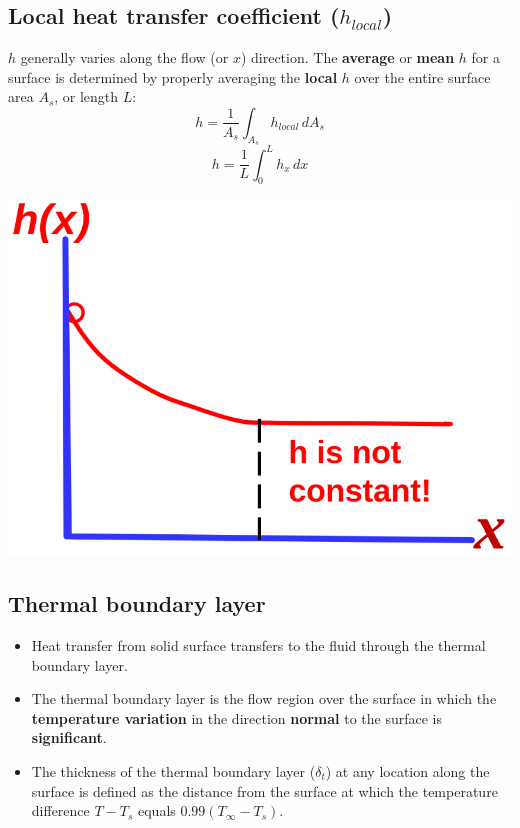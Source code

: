\documentclass[11pt]{article}
\begin{document}
 \newpage

\subsection{Local heat transfer coefficient (\(h_{local}\))}
\label{sec:orgdb3497e}
\(h\) generally varies along the flow (or \(x\)) direction. The \textbf{average} or \textbf{mean} \(h\) for a surface is determined by properly averaging the \textbf{local} \(h\) over the entire surface area \(A_s\), or length \(L\):
\[h = \frac{1}{A_s} \int_{A_s} h_{local} \, dA_s\]
\[h = \frac{1}{L} \int_0^L h_x \, dx\]

\begin{center}
\includegraphics[width=.9\linewidth]{./images/local-heat-transfer-coefficient-graph.png}
\end{center}

 \newpage

\subsection{Thermal boundary layer}
\label{sec:orgeb6677a}
\begin{itemize}
\item Heat transfer from solid surface transfers to the fluid through the thermal boundary layer.
\item The thermal boundary layer is the flow region over the surface in which the \textbf{temperature variation} in the direction \textbf{normal} to the surface is \textbf{significant}.
\item The thickness of the thermal boundary layer (\(\delta_t\)) at any location along the surface is defined as the distance from the surface at which the temperature difference \(T - T_s\) equals \(0.99 (T_{\infty} - T_s)\).
\end{itemize}
\end{document}
